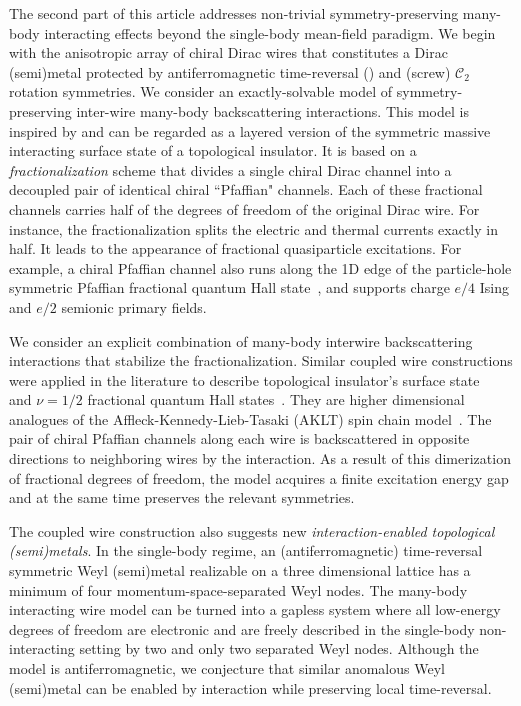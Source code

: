 The second part of this article addresses non-trivial symmetry-preserving many-body interacting effects beyond the single-body mean-field paradigm. We begin with the anisotropic array of chiral Dirac wires that constitutes a Dirac (semi)metal protected by antiferromagnetic time-reversal (\AFTR) and (screw) $\mathcal{C}_2$ rotation symmetries. We consider an exactly-solvable model of symmetry-preserving inter-wire many-body backscattering interactions. This model is inspired by and can be regarded as a layered version of the symmetric massive interacting surface state of a topological insulator. It is based on a {\em fractionalization} scheme that divides a single chiral Dirac channel into a decoupled pair of identical chiral ``Pfaffian" channels. Each of these fractional channels carries half of the degrees of freedom of the original Dirac wire. For instance, the fractionalization splits the electric and thermal currents exactly in half. %
It leads to the appearance of fractional quasiparticle excitations. For example, a chiral Pfaffian channel also runs along the 1D edge of the particle-hole symmetric Pfaffian fractional quantum Hall state~\cite{Son15,BarkeshliMulliganFisher15,WangSenthil16}, and supports charge $e/4$ Ising and $e/2$ semionic primary fields.

We consider an explicit combination of many-body interwire backscattering interactions that stabilize the fractionalization. Similar coupled wire constructions were applied in the literature to describe topological insulator's surface state~\cite{MrossEssinAlicea15} and $\nu=1/2$ fractional quantum Hall states~\cite{TeoKaneCouplewires,KaneSternHalperin17}. They are higher dimensional analogues of the Affleck-Kennedy-Lieb-Tasaki (AKLT) spin chain model~\cite{AKLT1,AKLT2}. The pair of chiral Pfaffian channels along each wire is backscattered in opposite directions to neighboring wires by the interaction. As a result of this dimerization of fractional degrees of freedom, the model acquires a finite excitation energy gap and at the same time preserves the relevant symmetries.

The coupled wire construction also suggests new {\em interaction-enabled topological (semi)metals}. In the single-body regime, an (antiferromagnetic) time-reversal symmetric Weyl (semi)metal realizable on a three dimensional lattice has a minimum of four momentum-space-separated Weyl nodes. The many-body interacting wire model can be turned into a gapless system where all low-energy degrees of freedom are electronic and are freely described in the single-body non-interacting setting by two and only two separated Weyl nodes. Although the model is antiferromagnetic, we conjecture that similar anomalous Weyl (semi)metal can be enabled by interaction while preserving local time-reversal.

